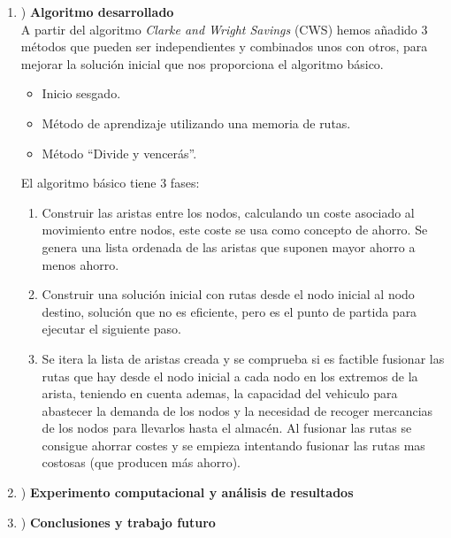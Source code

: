 \documentclass[11pt]{article} %
\begin{document}
\begin{enumerate}
   \item) \textbf{Algoritmo desarrollado}\\[0.2cm]
A partir del algoritmo \textit{Clarke and Wright Savings} (CWS) hemos añadido 3 métodos que pueden ser independientes y combinados unos con otros, para mejorar la solución inicial que nos proporciona el algoritmo básico.
\begin{itemize}
\item Inicio sesgado.
\item Método de aprendizaje utilizando una memoria de rutas.
\item Método “Divide y vencerás”.
\end{itemize}
El algoritmo básico tiene 3 fases:
\renewcommand{\labelenumii}{\arabic{enumii}}
\begin{enumerate}
\item Construir las aristas entre los nodos, calculando un coste asociado al movimiento entre nodos, este coste se usa como concepto de ahorro. Se genera una lista ordenada de las aristas que suponen mayor ahorro a menos ahorro.
\item Construir una solución inicial con rutas desde el nodo inicial al nodo destino, solución que no es eficiente, pero es el punto de partida para ejecutar el siguiente paso.
\item Se itera la lista de aristas creada y se comprueba si es factible fusionar las rutas que hay desde el nodo inicial a cada nodo en los extremos de la arista, teniendo en cuenta ademas, la capacidad del vehiculo para abastecer la demanda de los nodos y la necesidad de recoger mercancias de los nodos para llevarlos hasta el almacén. Al fusionar las rutas se consigue ahorrar costes y se empieza intentando fusionar las rutas mas costosas (que producen más ahorro).
\end{enumerate}

   \item) \textbf{Experimento computacional y análisis de resultados}\\[0.2cm]

   \item) \textbf{Conclusiones y trabajo futuro}\\[0.2cm]


 \end{enumerate}
\end{document}
